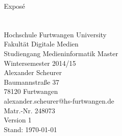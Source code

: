 \begin{titlepage}
\begin{center}

\Huge
Expos\'{e}\\[24pt]

\huge
{}\\[24pt]

\LARGE
{}\\[24pt]

\large
Hochschule Furtwangen University\\
Fakultät Digitale Medien\\
Studiengang Medieninformatik Master\\
Wintersemester 2014/15\\[24pt]

\normalsize
Alexander Scheurer\\
Baumannstraße 37\\
78120 Furtwangen\\[12pt]
alexander.scheurer@hs-furtwangen.de\\
Matr.-Nr. 248073\\[24pt]

Version 1\\
Stand: \today

\end{center}
\end{titlepage}